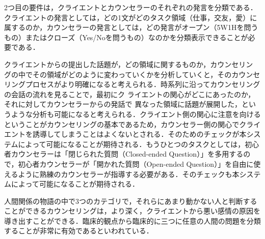 \documentclass[shuuron]{kuee}
\begin{document}
2つ目の要件は，クライエントとカウンセラーのそれぞれの発言を分類である．クライエントの発言としては，どの1文がどのタスク領域（仕事，交友，愛）に属するのか，カウンセラーの発言としては，どの発言がオープン（5W1Hを問うもの）またはクローズ（Yes/Noを問うもの）なのかを分類表示できることが必要である．

クライエントからの提出した話題が，どの領域に関するものか，カウンセリン
グの中でその領域がどのように変わっていくかを分析していくと，そのカウンセ
リングプロセスがより明確になると考えられる．時系列に沿ってカウンセリングの会話の流れを見ることで，最初にク
ライエントの関心がどこにあったのか，それに対してカウンセラーからの発話で
異なった領域に話題が展開した，というような分析も可能になると考えられる．クライエント側の関心に注意を向けるということがカウンセリングの基本であるため，カウンセラー側の関心でクライエントを誘導してしまうことはよくないとされる．そのためのチェックが本システムによって可能になることが期待される．もうひとつのタスクとしては，初心者カウンセラーは「閉じられた質問（Closed-ended Question）」を多用するので，初心者カウンセラーが「開かれた質問（Open-ended Question）」を自由に使えるように熟練のカウンセラーが指導する必要がある．そのチェックも本システムによって可能になることが期待される．



%


人間関係の物語の中で3つのカテゴリで，それらにあまり動かない人と判断することができるカウンセリングは，より深く，クライエントから悪い感情の原因を導き出すことができる．臨床的観点から臨床的に三つに任意の人間の問題を分類することが非常に有効であるといわれている．
\end{document}
